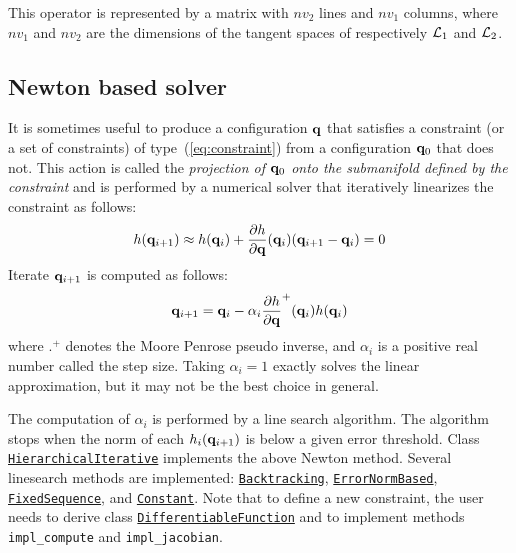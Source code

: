 This operator is represented by a matrix with $nv_2$ lines and $nv_1$ columns, where $nv_1$ and $nv_2$ are the dimensions of the tangent spaces of respectively $\mathcal{L}_1$ and $\mathcal{L}_2$.

\subsection{Newton based solver}

It is sometimes useful to produce a configuration $\mathbf{q}$ that satisfies a constraint (or a set of constraints) of type~(\ref{eq:constraint}) from a configuration $\mathbf{q}_0$ that does not. This action is called the \textit{projection of $\mathbf{q}_0$ onto the submanifold defined by the constraint} and is performed by a numerical solver that iteratively linearizes the constraint as follows:
$$
h(\mathbf{q}_{i+1}) \approx h(\mathbf{q}_i) + \frac{\partial h}{\partial \mathbf{q}}(\mathbf{q}_{i})(\mathbf{q}_{i+1}-\mathbf{q}_i) = 0
$$
Iterate $\mathbf{q}_{i+1}$ is computed as follows:
\begin{equation}\label{eq:HierarchicalIterative}
\conf_{i+1} = \conf_i-\alpha_i\frac{\partial h}{\partial \conf}^{+}(\conf_{i}) h(\conf_i)
\end{equation}
where $.^{+}$ denotes the Moore Penrose pseudo inverse, and $\alpha_i$ is a positive real number called the step size. Taking $\alpha_i=1$ exactly solves the linear approximation, but it may not be the best choice in general.

The computation of $\alpha_i$ is performed by a line search algorithm.
The algorithm stops when the norm of each $h_i(\mathbf{q}_{i+1})$ is below a given error threshold.
Class\\ \href{https://gepettoweb.laas.fr/hpp/hpp-constraints/doxygen-html/classhpp_1_1constraints_1_1solver_1_1HierarchicalIterative.html}{\texttt{HierarchicalIterative}} implements the above Newton method. Several linesearch methods are implemented: \href{https://gepettoweb.laas.fr/hpp/hpp-constraints/doxygen-html/structhpp_1_1constraints_1_1solver_1_1lineSearch_1_1Backtracking.html}{\texttt{Backtracking}}, \href{https://gepettoweb.laas.fr/hpp/hpp-constraints/doxygen-html/structhpp_1_1constraints_1_1solver_1_1lineSearch_1_1ErrorNormBased.html}{\texttt{ErrorNormBased}}, \href{https://gepettoweb.laas.fr/hpp/hpp-constraints/doxygen-html/structhpp_1_1constraints_1_1solver_1_1lineSearch_1_1FixedSequence.html}{\texttt{FixedSequence}}, and \href{https://gepettoweb.laas.fr/hpp/hpp-constraints/doxygen-html/structhpp_1_1constraints_1_1solver_1_1lineSearch_1_1Constant.html}{\texttt{Constant}}.
Note that to define a new constraint, the user needs to derive class \href{https://gepettoweb.laas.fr/hpp/hpp-constraints/doxygen-html/classhpp_1_1constraints_1_1DifferentiableFunction.html}{\texttt{DifferentiableFunction}} and to implement methods \texttt{impl\_compute} and \texttt{impl\_jacobian}.

